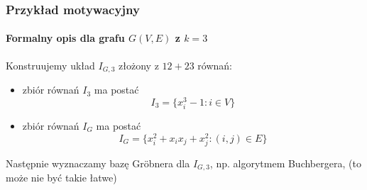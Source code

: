 \documentclass{beamer}
\begin{document}
\begin{frame}
    \frametitle{Przykład motywacyjny}
    \framesubtitle{Formalny opis dla grafu $G(V,E)$ z $k=3$}

    Konstruujemy układ $I_{G,3}$ złożony z $12 + 23$ równań:
    \begin{itemize}
        \item zbiór równań $I_3$ ma postać
            \begin{equation*}
                I_3 = \{ x_i^3 - 1 : i \in V \}
            \end{equation*}
            \pause
        \item zbiór równań $I_G$ ma postać
            \begin{equation*}
                I_G = \{ x_i^2 + x_i x_j + x_j^2 : (i,j) \in E \}
            \end{equation*}
    \end{itemize}
    \pause
    Następnie wyznaczamy bazę Gr\"{o}bnera dla $I_{G,3}$, np. algorytmem
    Buchbergera, \structure{\ldots} (to może nie być takie łatwe)
\end{frame}
\end{document}
